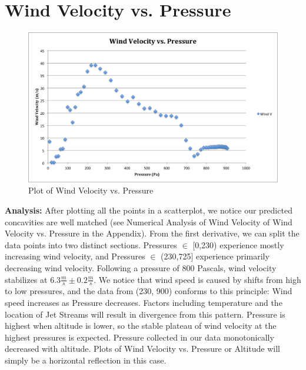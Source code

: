 \documentclass{journal}
\begin{document}
\part{Wind Velocity vs. Pressure}
\begin{figure}[H]
\centering
\includegraphics[width=5in]{IMG1CDATA.png}
\caption{Plot of Wind Velocity vs. Pressure}
\end{figure}

\begin{flushleft}
\textbf{Analysis:} After plotting all the points in a scatterplot, we notice our predicted concavities are well matched (see Numerical Analysis of Wind Velocity of Wind Velocity vs. Pressure in the Appendix).  From the first derivative, we can split the data points into two distinct sections.  Pressures $\in$ [0,230) experience mostly increasing wind velocity, and Pressures $\in$ (230,725] experience primarily decreasing wind velocity.  Following a pressure of 800 Pascals, wind velocity stabilizes at $6.3\frac{m}{s} \pm 0.2\frac{m}{s}$.  We notice that wind speed is caused by shifts from high to low pressures, and the data from (230, 900) conforms to this principle: Wind speed increases as Pressure decreases.  Factors including temperature and the location of Jet Streams will result in divergence from this pattern.  Pressure is highest when altitude is lower, so the stable plateau of wind velocity at the highest pressures is expected.  Pressure collected in our data monotonically decreased with altitude.  Plots of Wind Velocity vs. Pressure or Altitude will simply be a horizontal reflection in this case.
\end{flushleft}
\end{document}
